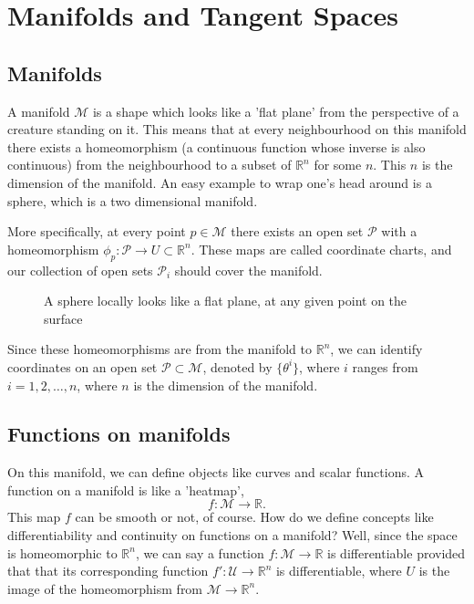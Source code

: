 \documentclass[11pt, oneside]{article}   	%
\theoremstyle{slanted}
\begin{document}
\pagebreak
  
\section{Manifolds and Tangent Spaces}

\subsection{Manifolds}

A manifold $\mathcal{M}$ is a shape which looks like a 'flat plane' from the perspective of a creature standing on it. This means that at every neighbourhood on this manifold there exists a homeomorphism (a continuous function whose inverse is also continuous) from the neighbourhood to a subset of $\mathbb{R}^n$ for some $n$. This $n$ is the dimension of the manifold. An easy example to wrap one's head around is a sphere, which is a two dimensional manifold. 

More specifically, at every point $p \in \mathcal{M}$ there exists an open set $\mathcal{P} $ with a homeomorphism $\phi_p : \mathcal{ P } \rightarrow U \subset \mathbb{R}^n $. These maps are called coordinate charts, and our collection of open sets $\mathcal{ P}_i $ should cover the manifold. 
\begin{figure}[h]
	\centering 
{}
	\caption{A sphere locally looks like a flat plane, at any given point on the surface} 
\end{figure}

Since these homeomorphisms are from the manifold to $\mathbb{R}^n$, we can identify coordinates on an open set $\mathcal{P} \subset \mathcal{M}$, denoted by $\{ \theta^i \}$, where $i$ ranges from $i  = 1, 2, \dots, n$, where $n$ is the dimension of the manifold.

\subsection{Functions on manifolds} 
On this manifold, we can define objects like curves and scalar functions.  A function on a manifold is like a 'heatmap', 
\[
	f : \mathcal{M} \rightarrow \mathbb{R}. 
\]
This map $f$ can be smooth or not, of course. How do we define concepts like differentiability and continuity on functions on a manifold? Well, since the space is homeomorphic to $\mathbb{R}^n$, we can say a function $f : \mathcal{M} \rightarrow \mathbb{R}$ is differentiable provided that that its corresponding function $f' : \mathcal{U} \rightarrow \mathbb{R}^n$ is differentiable, where $U$ is the image of the homeomorphism from $\mathcal{M} \rightarrow \mathbb{R}^n$. 
\end{document}
